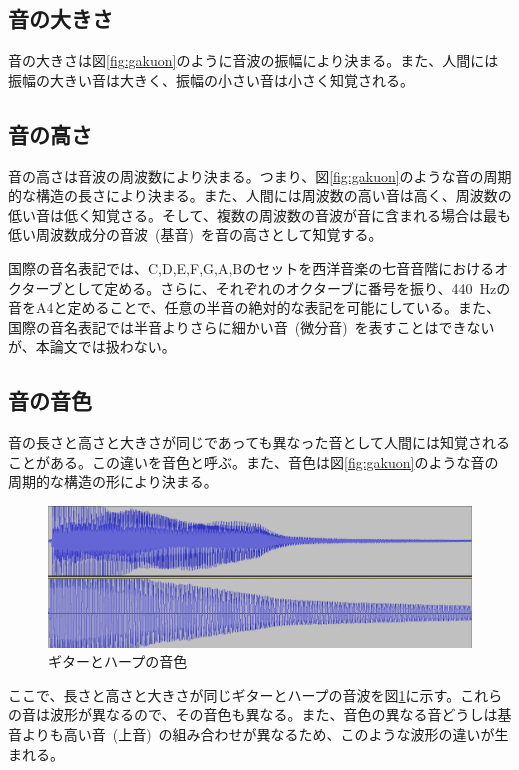 \subsection{音の大きさ}

音の大きさは図\ref{fig:gakuon}のように音波の振幅により決まる。また、人間には振幅の大きい音は大きく、振幅の小さい音は小さく知覚される。

\subsection{音の高さ}

音の高さは音波の周波数により決まる。つまり、図\ref{fig:gakuon}のような音の周期的な構造の長さにより決まる。また、人間には周波数の高い音は高く、周波数の低い音は低く知覚さる。そして、複数の周波数の音波が音に含まれる場合は最も低い周波数成分の音波~(基音)~を音の高さとして知覚する。

国際の音名表記では、C,D,E,F,G,A,Bのセットを西洋音楽の七音音階におけるオクターブとして定める。さらに、それぞれのオクターブに番号を振り、440~Hzの音をA4と定めることで、任意の半音の絶対的な表記を可能にしている。また、国際の音名表記では半音よりさらに細かい音~(微分音)~を表すことはできないが、本論文では扱わない。

\subsection{音の音色}

音の長さと高さと大きさが同じであっても異なった音として人間には知覚されることがある。この違いを音色と呼ぶ。また、音色は図\ref{fig:gakuon}のような音の周期的な構造の形により決まる。

\begin{figure}[t]
\begin{center}
\includegraphics[width=\hsize]{figure/c4_guitar_harp.png}
\caption{ギターとハープの音色}
\label{fig:guitar_harp_comp}
\end{center}
\end{figure}

ここで、長さと高さと大きさが同じギターとハープの音波を図\ref{fig:guitar_harp_comp}に示す。これらの音は波形が異なるので、その音色も異なる。また、音色の異なる音どうしは基音よりも高い音~(上音)~の組み合わせが異なるため、このような波形の違いが生まれる。

